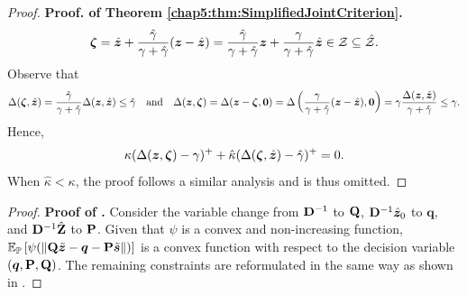\documentclass[mnsc, nonblindrev]{informswp}
\newcommand{\1}[1]{\mathds{1}{\left(#1\right)}}
\begin{document}
\begin{appendices}
\begin{proof}{\bf Proof. of Theorem \ref{chap5:thm:SimplifiedJointCriterion}.}
$$
\bm \zeta = \hat{\bm{z}} + \frac{\hat \gamma}{\gamma +\hat\gamma }(\bm z - \hat{\bm{z}}) =  \frac{\hat \gamma}{\gamma +\hat\gamma }\bm z + \frac{\gamma}{\gamma +\hat\gamma }\hat{\bm{z}} \in \mathcal{Z} \subseteq \hat {\mathcal{Z}}. 
$$
Observe that 
$$
\Delta(\bm \zeta,\hat{\bm{z}}) = \frac{\hat \gamma}{\gamma +\hat\gamma } \Delta(\bm z,\hat{\bm{z}}) \leq \hat \gamma
~~~\text{and}~~~
\Delta(\bm z,\bm \zeta)=\Delta(\bm z - \bm \zeta,\bm 0) = \Delta\left(  \frac{\gamma}{\gamma +\hat\gamma }(\bm z - \hat{\bm{z}}),\bm 0\right) = \gamma \frac{\Delta(\bm z,\hat{\bm{z}})}{\gamma + \hat \gamma} \leq \gamma.
$$
Hence,
$$
\kappa (  \Delta(\bm z,\bm \zeta) - \gamma)^+ + \hat \kappa ( \Delta(\bm \zeta,\hat{\bm{z}}) - \hat \gamma)^+ = 0. 
$$
When $\hat \kappa < \kappa$, the proof follows a similar analysis and is thus omitted.
\hfill \Halmos
\end{proof}
\vspace{3mm}

\begin{proof}{\bf Proof of .}
Consider the variable change from ${\mathbf{D}}^{-1}$ to ${\mathbf{Q}}$, ${\mathbf{D}}^{-1} \hat{\bm{z}}_0$ to $\bm q$, and ${\mathbf{D}}^{-1} {\hat{\mathbf{Z}}}$ to ${\mathbf{P}}$. Given that $\psi$ is a convex and non-increasing function, $\mathbb{E}_{\mathbb{P}}\left[\psi(\|{\mathbf{Q}} \tilde{\bm{z}} - \bm q - {\mathbf{P}} \tilde{\bm{s}}\|)\right]$ is a convex function with respect to the decision variable $(\bm q,{\mathbf{P}},{\mathbf{Q}})$. The remaining constraints are reformulated in the same way as shown in .
\hfill \Halmos
\end{proof}
\vspace{3mm}


\end{appendices}
\end{document}
